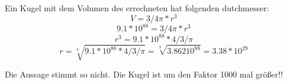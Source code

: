 Ein Kugel mit dem Volumen des errechneten hat folgenden dutchmesser:
\begin{equation*}
  V = 3/4 \pi * r^3
\end{equation*}
\begin{equation*}
  9.1 * 10^{88} = 3/4 \pi * r^3
\end{equation*}
\begin{equation*}
 r^3 = 9.1 * 10^{88}* 4/3  /\pi 
\end{equation*}
\begin{equation*}
 r = \sqrt[3]{9.1 * 10^{88}* 4/3  /\pi } = \sqrt[3]{3.862 10^{88}} = 3.38 * 10^{29}
\end{equation*}

Die Aussage stimmt so nicht. Die Kugel ist um den Faktor 1000 mal größer!!

